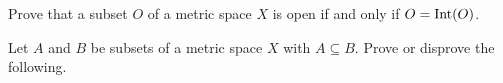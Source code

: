 \begin{comment}

\ExerciseSolution

	\ba
	\item Let $A$ be a subset of $X$ and let $a \in A$. Then $B(a, 1) = \{a\} \subset A$, and so $A$ is a neighborhood of each of its points. Therefore, $A$ is open. 

	\item Now let $f : X \to Y$ be a function. Let $O$ be an open subset of $Y$. Since every subset of $X$ is open (using the discrete metric), we see that $f^{-1}(O)$ is an open set in $X$, and $f$ is continuous. So every function $f: X \to Y$ is continuous if $X$ has the discrete metric. 

	\item This statement is not true. Let $X = Y = \R$, with the discrete metric on $X$ and the Euclidean metric on $Y$. Let $f : Y \to X$ be the identity function: $f(y) = y$ for all $y \in Y$. The set $\{0\}$ is open in $X$, but $f^{-1}(O) = \{0\}$ is not an open set in $Y$ because $\{0\}$ is not a neighborhood of $0$  
		\ea
	
\end{comment}



\item \label{ex:O_int_O} Prove that a subset $O$ of a metric space $X$ is open if and only if $O = \text{Int}(O)$. 

\begin{comment}

\ExerciseSolution Suppose $O$ is open. We show that $O = \Int(O)$. By definition, $\Int(O) \subseteq O$, so we only need to show that $O \subseteq \Int(O)$. Let $x \in O$. Since $O$ is open, there is an open ball $B$ that contains $x$ that is a subset of $O$. Thus, $O$ is a neighborhood of $x$ and so $x \in \Int(O)$. We conclude that $O = \Int(O)$. 

Now suppose that $O = \Int(O)$. To show that $O$ is open, we demonstrate that $O$ is a neighborhood of each of its points. Let $x \in O$. Then $x \in \Int(O)$ and $x$ is an interior point of $O$. This means that $O$ is a neighborhood of $x$ and so $O$ is a neighborhood of each of its points. This shows that $O$ is open. 

\end{comment}

\item Let $A$ and $B$ be subsets of a metric space $X$ with $A \subseteq B$. Prove or disprove the following.
\ba

